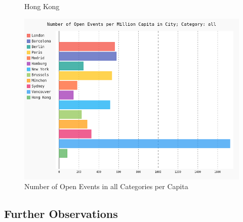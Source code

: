 \begin{figure}[!htp]
	\hfill
	\caption{Hong Kong}\label{fig:hongkongmap}
\end{figure}


\begin{figure}[!htp]
	\includegraphics[width=1\linewidth]{../plotting/pngs/activities_per_city_per_capita/all.png}
	\caption{Number of Open Events in all Categories per Capita}\label{fig:categories_all_percapita}	
\end{figure}


\subsection*{Further Observations}

